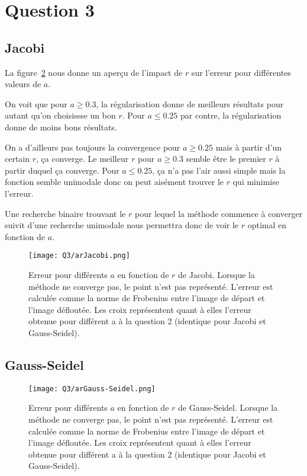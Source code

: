 \section{Question 3}

\subsection{Jacobi}
La figure~\ref{fig:ar} nous donne un aperçu de l'impact de $r$
sur l'erreur pour différentes valeurs de $a$.

On voit que pour $a \geq 0.3$, la régularisation donne de meilleurs résultats
pour autant qu'on choisissse un bon $r$.
Pour $a \leq 0.25$ par contre, la régularisation donne de moins bons résultats.

On a d'ailleurs pas toujours la convergence pour $a \geq 0.25$ mais à partir
d'un certain $r$, ça converge.
Le meilleur $r$ pour $a \geq 0.3$ semble être le premier $r$ à partir duquel
ça converge.
Pour $a \leq 0.25$, ça n'a pas l'air aussi simple mais la fonction semble
unimodale donc on peut aisément trouver le $r$ qui minimise l'erreur.

Une recherche binaire trouvant le $r$ pour lequel la méthode commence à converger
suivit d'une recherche unimodale nous permettra donc de voir le $r$ optimal en
fonction de $a$.

\begin{figure}
  \centering
  \texttt{[image: Q3/arJacobi.png]}
  \caption{Erreur pour différents $a$ en fonction de $r$ de Jacobi.
  Lorsque la méthode ne converge pas, le point n'est pas représenté.
  L'erreur est calculée comme la norme de Frobenius entre l'image de départ
  et l'image défloutée. Les croix représentent quant à elles l'erreur obtenue pour différent a à la question 2 (identique pour Jacobi et Gauss-Seidel).}
  \label{fig:ar}
\end{figure}

\subsection{Gauss-Seidel}

\begin{figure}
  \centering
  \texttt{[image: Q3/arGauss-Seidel.png]}
  \caption{Erreur pour différents $a$ en fonction de $r$ de Gauss-Seidel.
  Lorsque la méthode ne converge pas, le point n'est pas représenté.
  L'erreur est calculée comme la norme de Frobenius entre l'image de départ
  et l'image défloutée. Les croix représentent quant à elles l'erreur obtenue pour différent a à la question 2 (identique pour Jacobi et Gauss-Seidel).}
  \label{fig:ar}
\end{figure}


